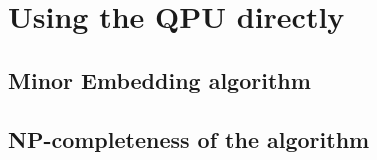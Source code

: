 \chapter{Using the QPU directly}
\section{Minor Embedding algorithm}
\section{NP-completeness of the algorithm}